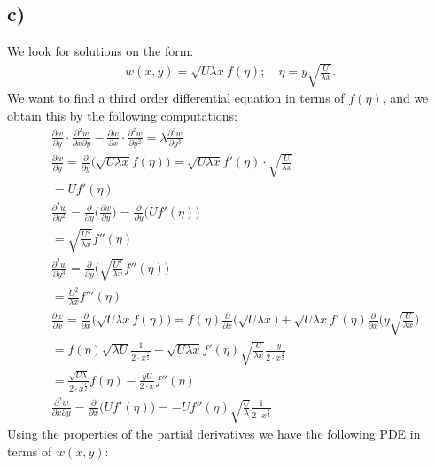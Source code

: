 \documentclass{article}
\begin{document}
\subsection*{c)}
We look for solutions on the form:
\begin{align*}
    w(x,y) = \sqrt{U\lambda x}f(\eta); \quad \eta = y \sqrt{\frac{U}{\lambda x}}.
\end{align*} We want to find a third order differential equation in terms of $f(\eta)$, and we obtain this by the following computations:
\begin{align*}
    &\frac{\partial w}{\partial y}\cdot \frac{\partial^2 w}{\partial x\partial y} - \frac{\partial w}{\partial x} \cdot \frac{\partial^2w}{\partial y^2} = \lambda \frac{\partial^3 w}{\partial y^3}\\
    &\frac{\partial w}{\partial y} = \frac{\partial}{\partial y}\Big(\sqrt{U\lambda x}f(\eta)\Big) = \sqrt{U\lambda x}f'(\eta) \cdot \sqrt{\frac{U}{\lambda x}}\\
    &= Uf'(\eta)\\
    &\frac{\partial^2 w}{\partial y^2} = \frac{\partial }{\partial y}\Big(\frac{\partial w}{\partial y}\Big) = \frac{\partial}{\partial y}\Big(U f'(\eta)\Big)\\
    &= \sqrt{\frac{U^3}{\lambda x}}f''(\eta)\\
    &\frac{\partial^3 w}{\partial y^3} = \frac{\partial }{\partial y}\Big(\sqrt{\frac{U^3}{\lambda x}}f''(\eta)\Big)\\
    &= \frac{U^2}{\lambda x}f'''(\eta)\\
    &\frac{\partial w}{\partial x} = \frac{\partial}{\partial x}\Big(\sqrt{U\lambda x}f(\eta)\Big) = f(\eta)\frac{\partial}{\partial x}\Big(\sqrt{U \lambda x}\Big) + \sqrt{U\lambda x}f'(\eta)\frac{\partial}{\partial x}\Big(y\sqrt{\frac{U}{\lambda x}}\Big)\\
    &= f(\eta)\sqrt{\lambda U}\frac{1}{2\cdot x^{\frac{1}{2}}} + \sqrt{U\lambda x}f'(\eta)\sqrt{\frac{U}{\lambda x}}\frac{-y}{2\cdot x^{\frac{3}{2}}}\\
    &= \frac{\sqrt{U\lambda }}{2\cdot x^{\frac{1}{2}}}f(\eta) - \frac{yU}{2\cdot x}f''(\eta)\\
    &\frac{\partial^2w}{\partial x\partial y} = \frac{\partial}{\partial x}\Big(Uf'(\eta)\Big) = -Uf''(\eta)\sqrt{\frac{U}{\lambda}}\frac{1}{2\cdot x^{\frac{3}{2}}}
\end{align*}Using the properties of the partial derivatives we have the following PDE in terms of $w(x,y)$:
\end{document}
